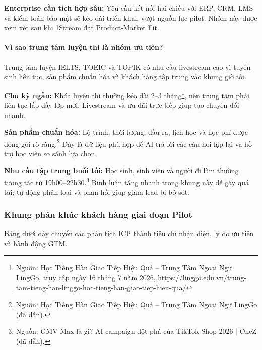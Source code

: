\textbf{Enterprise cần tích hợp sâu:} Yêu cầu kết nối hai chiều với ERP, CRM, LMS và kiểm toán bảo mật sẽ kéo dài triển khai, vượt nguồn lực pilot. Nhóm này được xem xét sau khi 1Stream đạt Product-Market Fit.

\paragraph{Vì sao trung tâm luyện thi là nhóm ưu tiên?}

Trung tâm luyện IELTS, TOEIC và TOPIK có nhu cầu livestream cao vì tuyển sinh liên tục, sản phẩm chuẩn hóa và khách hàng tập trung vào khung giờ tối.

\textbf{Chu kỳ ngắn:} Khóa luyện thi thường kéo dài 2--3 tháng\footnote{Nguồn: Học Tiếng Hàn Giao Tiếp Hiệu Quả -- Trung Tâm Ngoại Ngữ LingGo, truy cập ngày 16 tháng 7 năm 2026, \url{https://linggo.edu.vn/trung-tam-tieng-han-linggo-hoc-tieng-han-giao-tiep-hieu-qua/}}, nên trung tâm phải liên tục lấp đầy lớp mới. Livestream và ưu đãi trực tiếp giúp tạo chuyển đổi nhanh.

\textbf{Sản phẩm chuẩn hóa:} Lộ trình, thời lượng, đầu ra, lịch học và học phí được đóng gói rõ ràng.\footnote{Nguồn: Học Tiếng Hàn Giao Tiếp Hiệu Quả -- Trung Tâm Ngoại Ngữ LingGo (đã dẫn).} Đây là dữ liệu phù hợp để AI trả lời các câu hỏi lặp lại và hỗ trợ học viên so sánh lựa chọn.

\textbf{Nhu cầu tập trung buổi tối:} Học sinh, sinh viên và người đi làm thường tương tác từ 19h00--22h30.\footnote{Nguồn: GMV Max là gì? AI campaign đột phá của TikTok Shop 2026 | OneZ (đã dẫn).} Bình luận tăng nhanh trong khung này dễ gây quá tải; tự động phân loại và phản hồi giúp giảm lead bị bỏ sót.

\subsubsection{Khung phân khúc khách hàng giai đoạn Pilot}

Bảng dưới đây chuyển các phân tích ICP thành tiêu chí nhận diện, lý do ưu tiên và hành động GTM.

